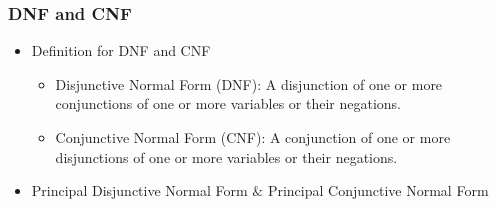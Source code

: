 \documentclass{beamer}
\begin{document}
\begin{frame}
\end{frame}

\begin{frame}
    \frametitle{DNF and CNF}
    \begin{itemize}
        \item Definition for DNF and CNF
              \begin{itemize}
                  \item Disjunctive Normal Form (DNF): A disjunction of one or more conjunctions of one or more variables or their negations.
                  \item Conjunctive Normal Form (CNF): A conjunction of one or more disjunctions of one or more variables or their negations.
              \end{itemize}
              \vspace*{1em}
        \item Principal Disjunctive Normal Form $\&$ Principal Conjunctive Normal Form
    \end{itemize}
\end{frame}
\end{document}
